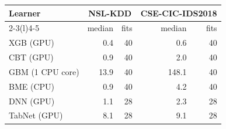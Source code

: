 \begin{tabular}{@{}lrrrr@{}}
\toprule
Learner & \multicolumn{2}{c}{NSL-KDD} & \multicolumn{2}{c}{CSE-CIC-IDS2018}\\
\cmidrule(lr){2-3}\cmidrule(l){4-5}
 & median & fits & median & fits\\
\midrule
XGB (GPU) & 0.4 & 40 & 0.6 & 40\\
CBT (GPU) & 0.9 & 40 & 2.0 & 40\\
GBM (1 CPU core) & 13.9 & 40 & 148.1 & 40\\
BME (CPU) & 0.9 & 40 & 4.2 & 40\\
DNN (GPU) & 1.1 & 28 & 2.3 & 28\\
TabNet (GPU) & 8.1 & 28 & 9.1 & 28\\
\bottomrule
\end{tabular}
